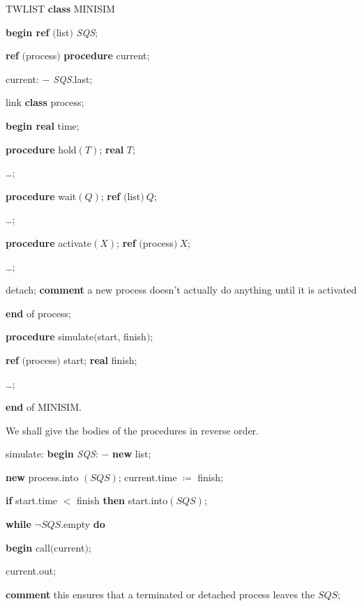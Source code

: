 \documentclass[twoside,11pt]{book}
\begin{document}
\quad TWLIST \textbf{class} MINISIM

\quad \textbf{begin ref} $($list$)$ \textit{SQS};

\quad \quad \textbf{ref} $($process$)$ \textbf{procedure} current;

\quad \quad \quad current: $-$ \textit{SQS}.last;

\quad \quad \quad link \textbf{class} process;

\quad \quad \quad \quad \textbf{begin real} time;

\quad \quad \quad \quad \quad \textbf{procedure} hold$(T)$; \textbf{real} $T$;

\quad \quad \quad \quad \quad \quad \dots;

\quad \quad \quad \quad \quad \textbf{procedure} wait$(Q)$; \textbf{ref} $($list$)\ Q$;

\quad \quad \quad \quad \quad \quad \dots;

\quad \quad \quad \quad \quad \textbf{procedure} activate$(X)$; \textbf{ref} $($process$)\ X$;

\quad \quad \quad \quad \quad \quad \dots;

\parindent\quad \quad \quad \quad \quad detach; \textbf{comment} a new process doesn't actually do anything until it is activated

\quad \quad \quad \quad \textbf{end} of process;

\quad \quad \quad \textbf{procedure} simulate$($start, finish$)$;

\quad \quad \quad \quad \textbf{ref} $($process$)$ start; \textbf{real} finish;

\quad \quad \quad \quad \quad \dots;

\quad \quad \textbf{end} of MINISIM.

\noindent
We shall give the bodies of the procedures in reverse order.

\quad simulate: \textbf{begin} \textit{SQS}: $-$ \textbf{new} list;

\quad \quad \textbf{new} process.into $(SQS)$; current.time $\coloneq$ finish;

\quad \quad \quad \textbf{if} start.time $<$ finish \textbf{then} start.into$(SQS)$;

\quad \quad \quad \textbf{while} $\neg SQS$.empty \textbf{do}

\quad \quad \quad \quad \textbf{begin} call$($current$)$;

\quad \quad \quad \quad \quad current.out;

\parindent\quad \quad \quad \quad \quad \textbf{comment} this ensures that a terminated or detached process leaves the $SQS$;
\end{document}
